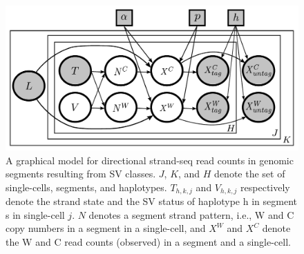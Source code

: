 \documentclass[12pt]{article}
\renewcommand{\j}{j} %
\newcommand{\X}{X} %
\renewcommand{\k}{k} %
\newcommand{\h}{h} %
\newcommand{\T}{T} %
\newcommand{\V}{V} %
\newcommand{\N}{N} %
\begin{document}
\begin{figure}
	\begin{center}
		\includegraphics[width=\textwidth]{graphical_model_haplotagged-equal-sized-circle}
	\end{center}
\caption{A graphical model for directional strand-seq read counts in genomic segments resulting from SV classes. $J$, $K$, and $H$ denote the set of single-cells, segments, and haplotypes. $\T_{\h,\k,\j}$ and $\V_{\h,\k,\j}$ respectively denote the strand state and the SV status of haplotype h in segment s in single-cell $\j$. $\N$ denotes a segment strand pattern, i.e., W and C copy numbers in a segment in a single-cell, and $\X^W$ and $\X^C$ denote the W and C read counts (observed) in a segment and a single-cell.}
\end{figure}
\end{document}
